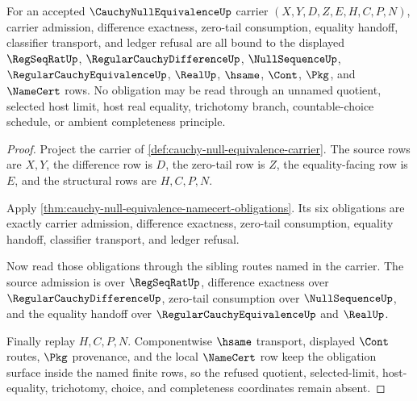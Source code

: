 \begin{theorem}
\label{thm:cauchy-null-equivalence-scoped-obligation-binding}
For an accepted $\CauchyNullEquivalenceUp$ carrier $(X,Y,D,Z,E,H,C,P,N)$, carrier admission, difference exactness, zero-tail consumption, equality handoff, classifier transport, and ledger refusal are all bound to the displayed $\RegSeqRatUp$, $\RegularCauchyDifferenceUp$, $\NullSequenceUp$, $\RegularCauchyEquivalenceUp$, $\RealUp$, $\hsame$, $\Cont$, $\Pkg$, and $\NameCert$ rows. No obligation may be read through an unnamed quotient, selected host limit, host real equality, trichotomy branch, countable-choice schedule, or ambient completeness principle.
\end{theorem}
\begin{proof}
Project the carrier of \autoref{def:cauchy-null-equivalence-carrier}. The source rows are $X,Y$, the difference row is $D$, the zero-tail row is $Z$, the equality-facing row is $E$, and the structural rows are $H,C,P,N$.

Apply \autoref{thm:cauchy-null-equivalence-namecert-obligations}. Its six obligations are exactly carrier admission, difference exactness, zero-tail consumption, equality handoff, classifier transport, and ledger refusal.

Now read those obligations through the sibling routes named in the carrier. The source admission is over $\RegSeqRatUp$, difference exactness over $\RegularCauchyDifferenceUp$, zero-tail consumption over $\NullSequenceUp$, and the equality handoff over $\RegularCauchyEquivalenceUp$ and $\RealUp$.

Finally replay $H,C,P,N$. Componentwise $\hsame$ transport, displayed $\Cont$ routes, $\Pkg$ provenance, and the local $\NameCert$ row keep the obligation surface inside the named finite rows, so the refused quotient, selected-limit, host-equality, trichotomy, choice, and completeness coordinates remain absent.
\end{proof}

